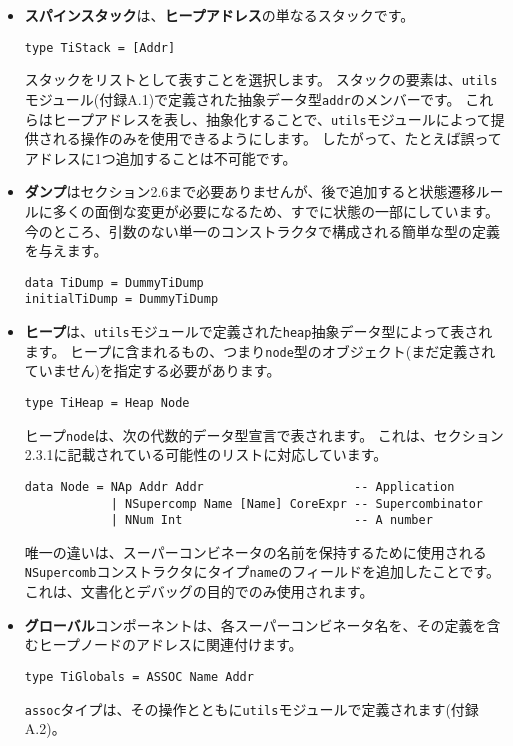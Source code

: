 \documentclass{jarticle}
\begin{document}
\begin{itemize}
	\item \textbf{スパインスタック}は、\textbf{ヒープアドレス}の単なるスタックです。
	      \begin{verbatim}
type TiStack = [Addr]
\end{verbatim}
	      スタックをリストとして表すことを選択します。
	      スタックの要素は、\texttt{utils}モジュール(付録A.1)で定義された抽象データ型\texttt{addr}のメンバーです。
	      これらはヒープアドレスを表し、抽象化することで、\texttt{utils}モジュールによって提供される操作のみを使用できるようにします。
	      したがって、たとえば誤ってアドレスに1つ追加することは不可能です。
	\item \textbf{ダンプ}はセクション2.6まで必要ありませんが、後で追加すると状態遷移ルールに多くの面倒な変更が必要になるため、すでに状態の一部にしています。
	      今のところ、引数のない単一のコンストラクタで構成される簡単な型の定義を与えます。
	      \begin{verbatim}
data TiDump = DummyTiDump
initialTiDump = DummyTiDump
\end{verbatim}
	\item \textbf{ヒープ}は、\texttt{utils}モジュールで定義された\texttt{heap}抽象データ型によって表されます。
	      ヒープに含まれるもの、つまり\texttt{node}型のオブジェクト(まだ定義されていません)を指定する必要があります。
	      \begin{verbatim}
type TiHeap = Heap Node
\end{verbatim}
	      ヒープ\texttt{node}は、次の代数的データ型宣言で表されます。
	      これは、セクション2.3.1に記載されている可能性のリストに対応しています。
	      \begin{verbatim}
data Node = NAp Addr Addr                     -- Application
            | NSupercomp Name [Name] CoreExpr -- Supercombinator
            | NNum Int                        -- A number
\end{verbatim}
	      唯一の違いは、スーパーコンビネータの名前を保持するために使用される\texttt{NSupercomb}コンストラクタにタイプ\texttt{name}のフィールドを追加したことです。
	      これは、文書化とデバッグの目的でのみ使用されます。
	\item \textbf{グローバル}コンポーネントは、各スーパーコンビネータ名を、その定義を含むヒープノードのアドレスに関連付けます。
	      \begin{verbatim}
type TiGlobals = ASSOC Name Addr
\end{verbatim}
	      \texttt{assoc}タイプは、その操作とともに\texttt{utils}モジュールで定義されます(付録A.2)。

\end{itemize}
\end{document}
